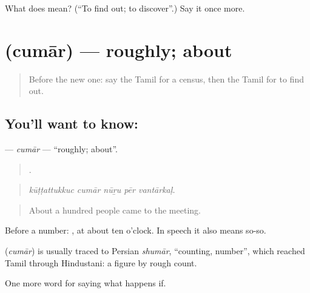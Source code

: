 \begin{tcolorbox}[breakable,colback=teal!4,colframe=teal!35!black,title={Before you move on}]
What does  mean? (\textquotedblleft{}To find out; to discover\textquotedblright{}.) Say it once more.
\end{tcolorbox}
\section[\texorpdfstring{\ta{சுமார்} (cumār)}{சுமார் (cumār)}]{ (cumār) — roughly; about}

\label{lesson:TA-C393-cumar}



\begin{quote}
Before the new one: say the Tamil for a census, then the Tamil for to find out.
\end{quote}

\subsection*{You'll want to know: }
\textbf{} — \emph{cumār} — \textquotedblleft{}roughly; about\textquotedblright{}.

\begin{quote}
    .
\end{quote}

\begin{quote}
\emph{kūṭṭattukkuc cumār nūṟu pēr vantārkaḷ.}
\end{quote}

\begin{quote}
About a hundred people came to the meeting.
\end{quote}

Before a number:   , at about ten o'clock. In speech it also means so-so.

\begin{cousinweb}
\textbf{} (\emph{cumār}) is usually traced to Persian \emph{shumār}, \textquotedblleft{}counting, number\textquotedblright{}, which reached Tamil through Hindustani: a figure by rough count.
\end{cousinweb}

\begin{grammarlens}[title={What you've built}]
One more word for saying what happens if.
\end{grammarlens}

